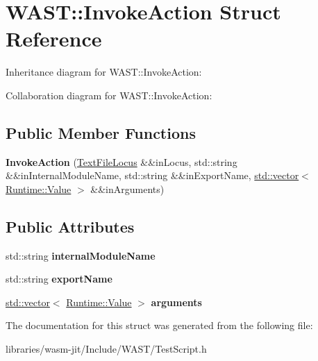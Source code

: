 \hypertarget{struct_w_a_s_t_1_1_invoke_action}{}\section{W\+A\+ST\+:\+:Invoke\+Action Struct Reference}
\label{struct_w_a_s_t_1_1_invoke_action}


Inheritance diagram for W\+A\+ST\+:\+:Invoke\+Action\+:


Collaboration diagram for W\+A\+ST\+:\+:Invoke\+Action\+:
\subsection*{Public Member Functions}
\begin{DoxyCompactItemize}
\item 
\mbox{\label{struct_w_a_s_t_1_1_invoke_action_ac44479a509723c131e0a8168186339de}} 
{\bfseries Invoke\+Action} (\mbox{\hyperlink{struct_w_a_s_t_1_1_text_file_locus}{Text\+File\+Locus}} \&\&in\+Locus, std\+::string \&\&in\+Internal\+Module\+Name, std\+::string \&\&in\+Export\+Name, \mbox{\hyperlink{classstd_1_1vector}{std\+::vector}}$<$ \mbox{\hyperlink{struct_runtime_1_1_value}{Runtime\+::\+Value}} $>$ \&\&in\+Arguments)
\end{DoxyCompactItemize}
\subsection*{Public Attributes}
\begin{DoxyCompactItemize}
\item 
\mbox{\label{struct_w_a_s_t_1_1_invoke_action_a42b2e508ff018966a86be5d4c51d69bf}} 
std\+::string {\bfseries internal\+Module\+Name}
\item 
\mbox{\label{struct_w_a_s_t_1_1_invoke_action_ab4d2b92ec166e49d43c243927bd2dd9c}} 
std\+::string {\bfseries export\+Name}
\item 
\mbox{\label{struct_w_a_s_t_1_1_invoke_action_ad882e9603f97e795c49942680029bea8}} 
\mbox{\hyperlink{classstd_1_1vector}{std\+::vector}}$<$ \mbox{\hyperlink{struct_runtime_1_1_value}{Runtime\+::\+Value}} $>$ {\bfseries arguments}
\end{DoxyCompactItemize}


The documentation for this struct was generated from the following file\+:\begin{DoxyCompactItemize}
\item 
libraries/wasm-\/jit/\+Include/\+W\+A\+S\+T/Test\+Script.\+h\end{DoxyCompactItemize}
